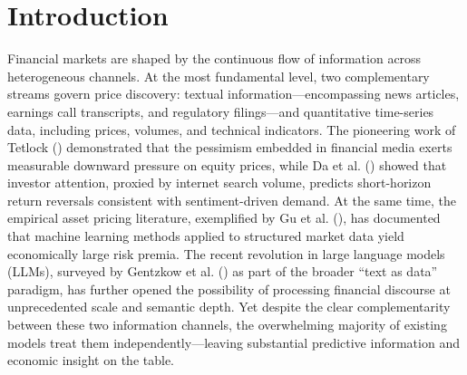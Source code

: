 \documentclass[
  11pt,
  a4paper,
]{article}
\begin{document}
\section{Introduction}\label{introduction}

Financial markets are shaped by the continuous flow of information
across heterogeneous channels. At the most fundamental level, two
complementary streams govern price discovery: textual
information---encompassing news articles, earnings call transcripts, and
regulatory filings---and quantitative time-series data, including
prices, volumes, and technical indicators. The pioneering work of
Tetlock () demonstrated that the
pessimism embedded in financial media exerts measurable downward
pressure on equity prices, while Da et al. ()
showed that investor attention, proxied by internet search volume,
predicts short-horizon return reversals consistent with sentiment-driven
demand. At the same time, the empirical asset pricing literature,
exemplified by Gu et al. (), has documented
that machine learning methods applied to structured market data yield
economically large risk premia. The recent revolution in large language
models (LLMs), surveyed by Gentzkow et al.
() as part of the broader ``text as
data'' paradigm, has further opened the possibility of processing
financial discourse at unprecedented scale and semantic depth. Yet
despite the clear complementarity between these two information
channels, the overwhelming majority of existing models treat them
independently---leaving substantial predictive information and economic
insight on the table.
\end{document}
